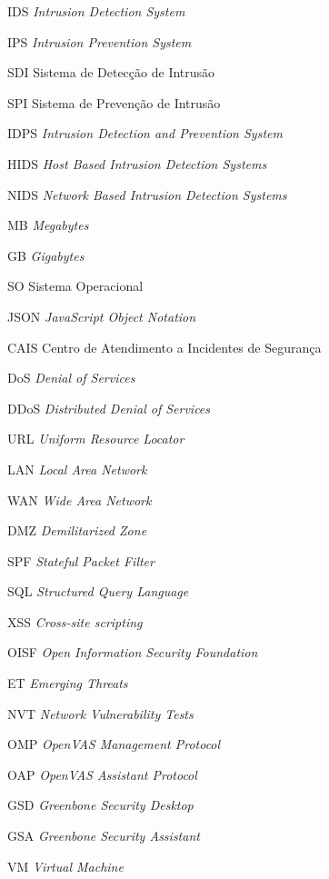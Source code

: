 \documentclass[
	12pt,				
	openright,		
	twoside,	
	a4paper,
	english,	
	brazil	
	]{abntex2}
\begin{document}
\begin{siglas}
  \item[IDS] \textit{Intrusion Detection System}
  \item[IPS] \textit{Intrusion Prevention System}
  \item[SDI] Sistema de Detecção de Intrusão
  \item[SPI] Sistema de Prevenção de Intrusão
  \item[IDPS] \textit{Intrusion Detection and Prevention System}
  \item[HIDS] \textit{Host Based Intrusion Detection Systems}
  \item[NIDS] \textit{Network Based Intrusion Detection Systems}
  \item[MB] \textit{Megabytes}
  \item[GB] \textit{Gigabytes}
  \item[SO] Sistema Operacional
  \item[JSON] \textit{JavaScript Object Notation}
  \item[CAIS] Centro de Atendimento a Incidentes de Segurança
  \item[DoS] \textit{Denial of Services}
  \item[DDoS] \textit{Distributed Denial of Services}
  \item[URL] \textit{Uniform Resource Locator}
  \item[LAN] \textit{Local Area Network}
  \item[WAN] \textit{Wide Area Network}
  \item[DMZ] \textit{Demilitarized Zone}
  \item[SPF] \textit{Stateful Packet Filter}
  \item[SQL] \textit{Structured Query Language}
  \item[XSS] \textit{Cross-site scripting}
  \item[OISF] \textit{Open Information Security Foundation}
  \item[ET] \textit{Emerging Threats}
  \item[NVT] \textit{Network Vulnerability Tests}
  \item[OMP] \textit{OpenVAS Management Protocol}
  \item[OAP] \textit{OpenVAS Assistant Protocol}
  \item[GSD] \textit{Greenbone Security Desktop}
  \item[GSA] \textit{Greenbone Security Assistant}
  \item[VM] \textit{Virtual Machine}
\end{siglas}
\tableofcontents*
\cleardoublepage
\textual





\postextual

\printindex
\end{document}
